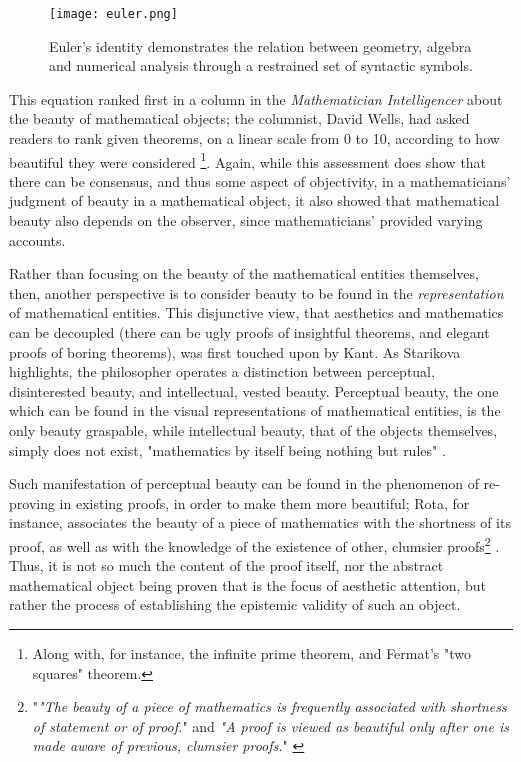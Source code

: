 \begin{figure}
    \texttt{[image: euler.png]}
    \caption{Euler's identity demonstrates the relation between geometry, algebra and numerical analysis through a restrained set of syntactic symbols.}
    \label{graphic:euler}
\end{figure}

This equation ranked first in a column in the \emph{Mathematician Intelligencer} about the beauty of mathematical objects; the columnist, David Wells, had asked readers to rank given theorems, on a linear scale from 0 to 10, according to how beautiful they were considered \citep{wells_are_1990}\footnote{Along with, for instance, the infinite prime theorem, and Fermat's "two squares" theorem.}. Again, while this assessment does show that there can be consensus, and thus some aspect of objectivity, in a mathematicians' judgment of beauty in a mathematical object, it also showed that mathematical beauty also depends on the observer, since mathematicians' provided varying accounts.

Rather than focusing on the beauty of the mathematical entities themselves, then, another perspective is to consider beauty to be found in the \emph{representation} of mathematical entities. This disjunctive view, that aesthetics and mathematics can be decoupled (there can be ugly proofs of insightful theorems, and elegant proofs of boring theorems), was first touched upon by Kant. As Starikova highlights, the philosopher operates a distinction between perceptual, disinterested beauty, and intellectual, vested beauty. Perceptual beauty, the one which can be found in the visual representations of mathematical entities, is the only beauty graspable, while intellectual beauty, that of the objects themselves, simply does not exist, "mathematics by itself being nothing but rules" \citep{starikova_aesthetic_2018}.

Such manifestation of perceptual beauty can be found in the phenomenon of re-proving in existing proofs, in order to make them more beautiful; Rota, for instance, associates the beauty of a piece of mathematics with the shortness of its proof, as well as with the knowledge of the existence of other, clumsier proofs\footnote{"\emph{"The beauty of a piece of mathematics is frequently associated with shortness of statement or of proof.}" and \emph{"A proof is viewed as beautiful only after one is made aware of previous, clumsier proofs.}" \citep{rota_phenomenology_1997}} \citep{rota_phenomenology_1997}. Thus, it is not so much the content of the proof itself, nor the abstract mathematical object being proven that is the focus of aesthetic attention, but rather the process of establishing the epistemic validity of such an object.

